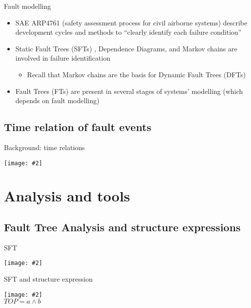 \documentclass{beamer}
\def\FT{%
	Fault Tree (FT)%
	\gdef\FT{FT\xspace}%
	\gdef\FTs{FTs\xspace}%
	\gdef\IFT{An FT\xspace}%
	\xspace%
}
\def\FTs{%
	Fault Trees (FTs)%
	\gdef\FT{FT\xspace}%
	\gdef\FTs{FTs\xspace}%
	\gdef\IFT{An FT\xspace}%
	\xspace%
}
\def\IFT{%
	A Fault Tree (FT)%
	\gdef\FT{FT\xspace}%
	\gdef\FTs{FTs\xspace}%
	\gdef\IFT{An FT\xspace}%
	\xspace%
}
\def\SFT{%
	Static Fault Tree (SFT)%
	\gdef\SFT{SFT\xspace}%
	\gdef\SFTs{SFTs\xspace}%
	\xspace%
}
\def\SFTs{%
	Static Fault Trees (SFTs)%
	\gdef\SFT{SFT\xspace}%
	\gdef\SFTs{SFTs\xspace}%
	\xspace%
}
\def\DFT{%
	Dynamic Fault Tree (DFT)%
	\gdef\DFT{DFT\xspace}%
	\gdef\DFTs{DFTs\xspace}%
	\xspace%
}
\def\DFTs{%
	Dynamic Fault Trees (DFTs)%
	\gdef\DFT{DFT\xspace}%
	\gdef\DFTs{DFTs\xspace}%
	\xspace%
}
\newcommand{\includegraphicsaspectratio}[2][1]{%
  \texttt{[image: \#2]}%
}
\begin{document}
\begin{frame}{Fault modelling}
	\begin{itemize}
		\item SAE ARP4761 (safety assessment process for civil airborne systems) describe development cycles and methods to ``clearly identify each failure condition''
		\item \SFTs, Dependence Diagrams, and Markov chains are involved in failure identification
		\begin{itemize}
			\item Recall that Markov chains are the basis for \DFTs
		\end{itemize}
		\item \FTs are present in several stages of systems' modelling (which depends on fault modelling)
	\end{itemize}
\end{frame}

\subsection{Time relation of fault events}

\begin{frame}{Background: time relations}
	\begin{center}
		\includegraphicsaspectratio[0.5]{time-relations}
	\end{center}
\end{frame}

\section{Analysis and tools}
\subsection{Fault Tree Analysis and structure expressions}
\begin{frame}{\SFT}
	\begin{center}
		\includegraphicsaspectratio[0.9]{sft-example-ald-software}
	\end{center}
\end{frame}

\begin{frame}{\SFT and structure expression}
	\begin{center}
		\includegraphicsaspectratio[0.45]{ex-fault-tree1}\\
		$TOP = a \land b$
	\end{center}
\end{frame}
\end{document}
